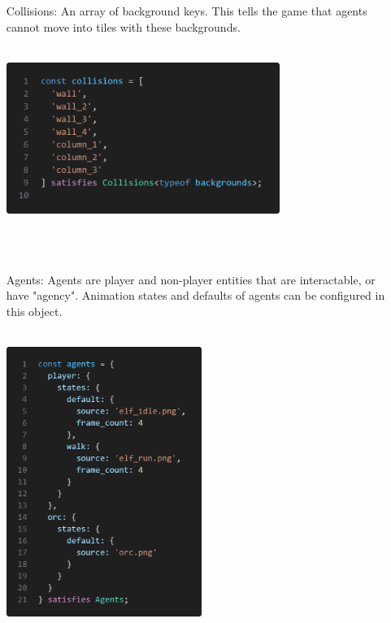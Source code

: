 \documentclass{article}
\begin{document}
\begin{itemize}
    \item[Collisions:] An array of background keys. This tells the game that agents cannot move into tiles with these backgrounds.\\\\
    \begin{minipage}{\linewidth}
        \centering
        \includegraphics[width=0.7\textwidth]{collisions.png}
    \end{minipage}\\\\
    
    \item[Agents:] Agents are player and non-player entities that are interactable, or have "agency". Animation states and defaults of agents can be configured in this object.\\\\
    \begin{minipage}{\linewidth}
        \centering
        \includegraphics[width=0.5\textwidth]{agents.png}
    \end{minipage}\\\\
    

\end{itemize}
\end{document}
